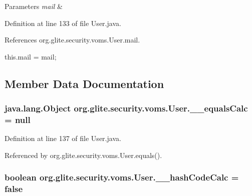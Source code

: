 \begin{DoxyParams}{Parameters}
{\em mail} & \\
\hline
\end{DoxyParams}


Definition at line 133 of file User.java.



References org.glite.security.voms.User.mail.


\begin{DoxyCode}
                                               {
        this.mail = mail;
    }
\end{DoxyCode}


\subsection{Member Data Documentation}
\hypertarget{classorg_1_1glite_1_1security_1_1voms_1_1User_a3db70b6c4abd628977a6b9a326c27ef8}{
\subsubsection[{\_\-\_\-equalsCalc}]{\setlength{\rightskip}{0pt plus 5cm}java.lang.Object {\bf org.glite.security.voms.User.\_\-\_\-equalsCalc} = null}}
\label{classorg_1_1glite_1_1security_1_1voms_1_1User_a3db70b6c4abd628977a6b9a326c27ef8}


Definition at line 137 of file User.java.



Referenced by org.glite.security.voms.User.equals().

\hypertarget{classorg_1_1glite_1_1security_1_1voms_1_1User_ab45ac1303077df637c51e2dc3a03639b}{
\subsubsection[{\_\-\_\-hashCodeCalc}]{\setlength{\rightskip}{0pt plus 5cm}boolean {\bf org.glite.security.voms.User.\_\-\_\-hashCodeCalc} = false}}
\label{classorg_1_1glite_1_1security_1_1voms_1_1User_ab45ac1303077df637c51e2dc3a03639b}


